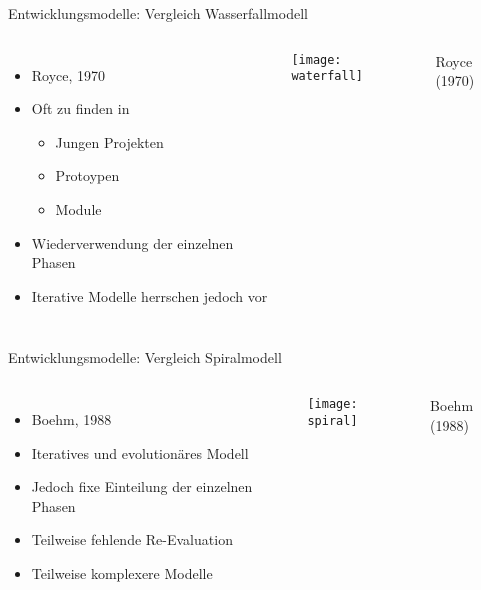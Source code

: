 \documentclass[11pt]{beamer}
\newlength{\colwidth}
\begin{document}
\begin{frame}{Entwicklungsmodelle: Vergleich Wasserfallmodell}
  \begin{center}
  \begin{columns}[T]
  \column{\colwidth}
  \begin{itemize}
    \item Royce, 1970
    \item Oft zu finden in
    \begin{itemize}
      \item Jungen Projekten
      \item Protoypen
      \item Module
    \end{itemize}
    \item Wiederverwendung der einzelnen Phasen
    \item Iterative Modelle herrschen jedoch vor
  \end{itemize}
  \column{\colwidth}
  \texttt{[image: waterfall]}

  {\tiny\hfill
  Royce (1970)
  }

  \end{columns}
  \end{center}
\end{frame}

\begin{frame}{Entwicklungsmodelle: Vergleich Spiralmodell}
  \begin{center}
  \begin{columns}[T]
  \column{\colwidth}
  \begin{itemize}
    \item Boehm, 1988
    \item Iteratives und evolutionäres Modell
    \item Jedoch fixe Einteilung der einzelnen Phasen
    \item Teilweise fehlende Re-Evaluation
    \item Teilweise komplexere Modelle
  \end{itemize}
  \column{\colwidth}
  \texttt{[image: spiral]}

  {\tiny\hfill
  Boehm (1988)
  }

  \end{columns}
  \end{center}
\end{frame}
\end{document}
